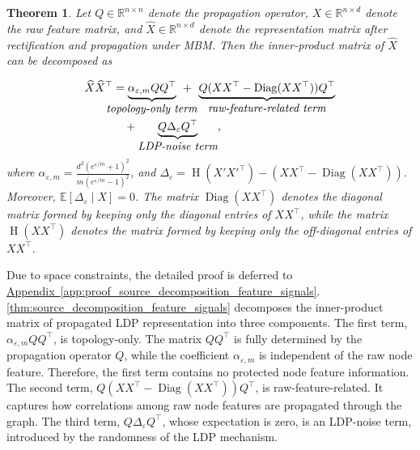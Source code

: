 \documentclass[conference,compsoc]{IEEEtran}
\theoremstyle{boldplain}
\newtheorem{theorem}{Theorem}
\theoremstyle{bolddefinition}
\theoremstyle{remark}
\newcommand{\appref}[1]{\hyperref[#1]{Appendix~\ref*{#1}}}
\newcommand{\mbmm}{MBM\xspace}
\begin{document}
\begin{theorem}
\label{thm:source_decomposition_feature_signals}
Let $Q\in\mathbb{R}^{n\times n}$ denote the propagation operator, $X\in\mathbb{R}^{n\times d}$ denote the raw feature matrix, and $\widehat X\in\mathbb{R}^{n\times d}$ denote the representation matrix after rectification and propagation under \mbmm. Then the inner-product matrix of $\widehat X$ can be decomposed as

\begin{equation}
\begin{aligned}
\widehat X\widehat X^\top
&=
\underbrace{\alpha_{\varepsilon,m} QQ^\top}_{\makebox[0pt]{\textit{\normalsize topology-only term}}}
\:\: + \:\:
\underbrace{Q(XX^\top-\operatorname{Diag}(XX^\top))Q^\top}_{\textit{\normalsize raw-feature-related term}} \\[0em]
&\quad+
\underbrace{Q\Delta_\varepsilon Q^\top}_{\textit{\normalsize LDP-noise term}},
\end{aligned}
\label{eq:decomposition}
\end{equation}
where
$\alpha_{\varepsilon,m} = \frac{d^2(e^{\varepsilon/m}+1)^2}{m(e^{\varepsilon/m}-1)^2}$, and $\Delta_\varepsilon=\operatorname{H}(X'X'^\top)-(XX^\top-\operatorname{Diag}(XX^\top))$.
Moreover, $\mathbb{E}[\Delta_\varepsilon\mid X]=0$. The matrix $\operatorname{Diag}(XX^\top)$ denotes the diagonal matrix formed by keeping only the diagonal entries of $XX^\top$, while the matrix $\operatorname{H}(XX^\top)$ denotes the matrix formed by keeping only the off-diagonal entries of $XX^\top$. 
\end{theorem}

Due to space constraints, the detailed proof is deferred to \appref{app:proof_source_decomposition_feature_signals}.
\autoref{thm:source_decomposition_feature_signals} decomposes the inner-product matrix of propagated LDP representation into three components. 
The first term, $\alpha_{\varepsilon,m}QQ^\top$, is topology-only. 
The matrix $QQ^\top$ is fully determined by the propagation operator $Q$, while the coefficient $\alpha_{\varepsilon,m}$ is independent of the raw node feature. 
Therefore, the first term contains no protected node feature information. 
The second term, $Q(XX^\top-\operatorname{Diag}(XX^\top))Q^\top$, is raw-feature-related. 
It captures how correlations among raw node features are propagated through the graph. 
The third term, $Q\Delta_\varepsilon Q^\top$, whose expectation is zero, is an LDP-noise term, introduced by the randomness of the LDP mechanism.
\end{document}
